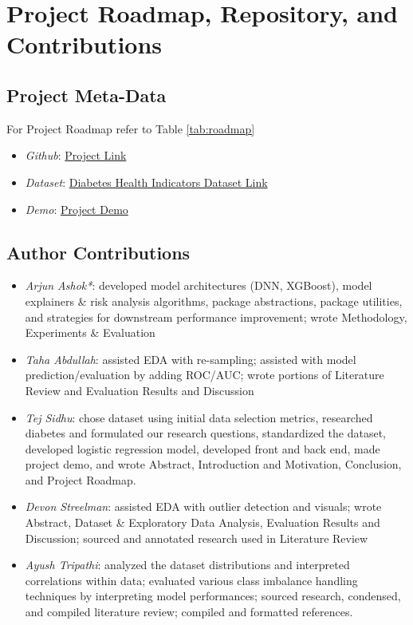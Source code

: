 \documentclass[conference]{IEEEtran}
\begin{document}
\section{Project Roadmap, Repository, and Contributions}\label{sec:roadmap}

\subsection{Project Meta-Data}
\noindent For Project Roadmap refer to Table \ref{tab:roadmap}\\

\begin{itemize}
    \item \textit{Github}: \href{https://github.com/arjashok/ecs-171-project}{Project Link}
    
    \item \textit{Dataset}: \href{https://www.kaggle.com/datasets/alexteboul/diabetes-health-indicators-dataset}{Diabetes Health Indicators Dataset Link}
    
    \item \textit{Demo}: \href{https://youtu.be/DyyqayuNF2Y}{Project Demo}
\end{itemize}

\subsection{Author Contributions}
    \begin{itemize}
        \item \textit{Arjun Ashok*}: developed model architectures (DNN, XGBoost), model explainers \& risk analysis algorithms, package abstractions, package utilities, and strategies for downstream performance improvement; wrote Methodology, Experiments \& Evaluation
        
        \item \textit{Taha Abdullah}: assisted EDA with re-sampling; assisted with model prediction/evaluation by adding ROC/AUC; wrote portions of Literature Review and Evaluation Results and Discussion
        
        \item \textit{Tej Sidhu}: chose dataset using initial data selection metrics, researched diabetes and formulated our research questions, standardized the dataset, developed logistic regression model, developed front and back end, made project demo, and wrote Abstract, Introduction and Motivation, Conclusion, and Project Roadmap.

        \item \textit{Devon Streelman}: assisted EDA with outlier detection and visuals; wrote Abstract, Dataset \& Exploratory Data Analysis, Evaluation Results and Discussion; sourced and annotated research used in Literature Review
                
        \item \textit{Ayush Tripathi}: analyzed the dataset distributions and interpreted correlations within data; evaluated various class imbalance handling techniques by interpreting model performances; sourced research, condensed, and compiled literature review; compiled and formatted references. 
    \end{itemize}
\end{document}
